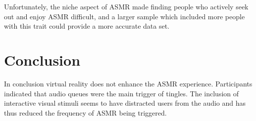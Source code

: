 \documentclass{sigchi}
\begin{document}
Unfortunately, the niche aspect of ASMR made finding people who actively seek out and enjoy ASMR difficult, and a larger sample which included more people with this trait could provide a more accurate data set.



%
%
%

\section{Conclusion}
In conclusion virtual reality does not enhance the ASMR experience. Participants indicated that audio queues were the main trigger of tingles. The inclusion of interactive visual stimuli seems to have distracted users from the audio and has thus reduced the frequency of ASMR being triggered.


\end{document}
